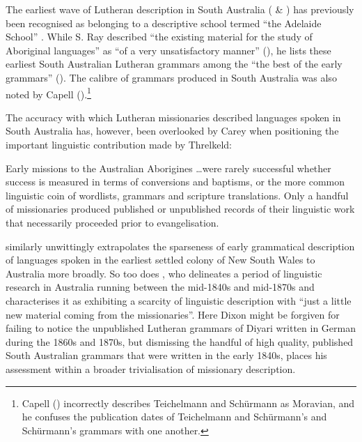 The earliest wave of Lutheran description in South Australia ( \& ) has previously been recognised as belonging to a descriptive school termed “the Adelaide School” \citep[410]{simpson_notes_1992}. While S. Ray described “the existing material for the study of Aboriginal languages” as “of a very unsatisfactory manner” (\citeyear[2]{ray_aboriginal_1925}), he lists these earliest South Australian Lutheran grammars among the “the best of the early grammars” (\citeyear[2]{ray_aboriginal_1925}). The calibre of grammars produced in South Australia was also noted by Capell (\citeyear[667]{capell_history_1970}).\footnote{Capell (\citeyear[668]{capell_history_1970}) incorrectly describes Teichelmann and Schürmann as Moravian, and he confuses the publication dates of Teichelmann and Schürmann’s and Schürmann’s grammars with one another.}   

The accuracy with which Lutheran missionaries described languages spoken in South Australia has, however, been overlooked by Carey when positioning the important linguistic contribution made by Threlkeld: 

\begin{modquote}
    Early missions to the Australian Aborigines …were rarely successful whether success is measured in terms of conversions and baptisms, or the more common linguistic coin of wordlists, grammars and scripture translations. Only a handful of missionaries produced published or unpublished records of their linguistic work that necessarily proceeded prior to evangelisation. \citep[258--259]{carey_lancelot_2004}
\end{modquote}

\citet[110]{roberts_language_2008} similarly unwittingly extrapolates the sparseness of early grammatical description of languages spoken in the earliest settled colony of New South Wales to Australia more broadly. So too does \citet[12]{dixon_languages_1980}, who delineates a period of linguistic research in Australia running between the mid-1840s and mid-1870s and characterises it as exhibiting a scarcity of linguistic description with “just a little new material coming from the missionaries”. Here Dixon might be forgiven for failing to notice the unpublished Lutheran grammars of Diyari written in German during the 1860s and 1870s, but dismissing the handful of high quality, published South Australian grammars that were written in the early 1840s, places his assessment within a broader trivialisation of missionary description. 

